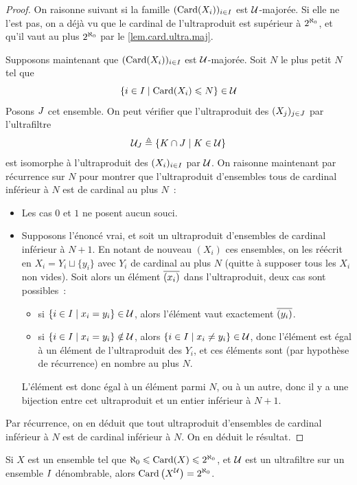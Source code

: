 \begin{proof}
  On raisonne suivant si la famille $(\operatorname{Card}(X_i))_{i \in I}$ est
  $\mathcal{U}$-majorée. Si elle ne l'est pas, on a déjà vu que le cardinal de
  l'ultraproduit est supérieur à $2^{\aleph_0}$, et qu'il vaut au plus $2^{\aleph_0}$
  par le \cref{lem.card.ultra.maj}.

  Supposons maintenant que $(\operatorname{Card}(X_i))_{i \in I}$ est $\mathcal{U}$-majorée.
  Soit $N$ le plus petit $N$ tel que
  \[\left\{ i \in I \;\middle\vert\; \operatorname{Card}(X_i) \leqslant N \right\} \in \mathcal{U}\]
  Posons $J$ cet ensemble. On peut vérifier que l'ultraproduit des
  $(X_j)_{j \in J}$ par l'ultrafiltre
  \[\mathcal{U}_{J} \triangleq
  \left\{ K \cap J \;\middle\vert\; K \in \mathcal{U} \right\}\]
  est isomorphe à l'ultraproduit des $(X_i)_{i \in I}$ par $\mathcal{U}$. On
  raisonne maintenant par récurrence sur $N$ pour montrer que l'ultraproduit
  d'ensembles tous de cardinal inférieur à $N$ est de cardinal au plus $N$~:
  \begin{itemize}
  \item Les cas $0$ et $1$ ne posent aucun souci.
  \item Supposons l'énoncé vrai, et soit un ultraproduit d'ensembles de cardinal
    inférieur à $N+1$. En notant de nouveau $(X_i)$ ces ensembles, on
    les réécrit en $X_i = Y_i \sqcup\{y_i\}$ avec $Y_i$ de cardinal au plus
    $N$ (quitte à supposer tous les $X_i$ non vides).
    Soit alors un élément $\overline{(x_i)}$ dans l'ultraproduit, deux cas sont
    possibles~:
    \begin{itemize}
    \item si $\left\{ i \in I \;\middle\vert\; x_i = y_i \right\}\in\mathcal{U}$, alors l'élément vaut
      exactement $\overline{(y_i)}$.
    \item si $\left\{ i \in I \;\middle\vert\; x_i = y_i \right\}\notin\mathcal{U}$, alors
      $\left\{ i \in I \;\middle\vert\; x_i \neq y_i \right\}\in\mathcal{U}$, donc l'élément est égal à
      un élément de l'ultraproduit des $Y_i$, et ces éléments sont (par
      hypothèse de récurrence) en nombre au plus $N$.
    \end{itemize}
    L'élément est donc égal à un élément parmi $N$, ou à un autre, donc il
    y a une bijection entre cet ultraproduit et un entier inférieur à $N+1$.
  \end{itemize}
  Par récurrence, on en déduit que tout ultraproduit d'ensembles de cardinal
  inférieur à $N$ est de cardinal inférieur à $N$. On en déduit le résultat.
\end{proof}

\begin{corollary}
  Si $X$ est un ensemble tel que $\aleph_0 \leqslant \operatorname{Card}(X)\leqslant2^{\aleph_0}$, et
  $\mathcal{U}$ est un ultrafiltre sur un ensemble $I$ dénombrable, alors
  $\displaystyle\operatorname{Card}\left(X^{\mathcal{U}}\right) = 2^{\aleph_0}$.
\end{corollary}

